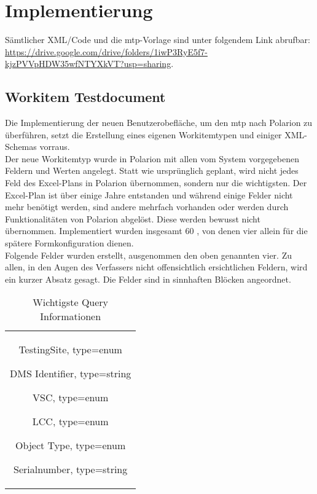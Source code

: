 \chapter{Implementierung}
\label{cha:impl}
\thispagestyle{scrheadings}
Sämtliche\*r XML/Code und die \ac{mtp}-Vorlage sind unter folgendem Link abrufbar: \url{https://drive.google.com/drive/folders/1iwP3RyE5f7-kjzPVVpHDW35wfNTYXkVT?usp=sharing}.
\section{Workitem Testdocument}
\label{sec:testdocu}
Die Implementierung der neuen Benutzerobefläche, um den \ac{mtp} nach Polarion zu überführen, setzt die Erstellung eines eigenen Workitemtypen und einiger XML-Schemas vorraus. \\
Der neue Workitemtyp  wurde in Polarion mit allen vom System vorgegebenen Feldern und Werten angelegt.
Statt wie ursprünglich geplant, wird nicht jedes Feld des Excel-Plans in Polarion übernommen, sondern nur die wichtigsten. Der Excel-Plan ist über einige Jahre entstanden und während einige Felder nicht mehr benötigt werden, sind andere mehrfach vorhanden oder werden durch Funktionalitäten von Polarion abgelöst. Diese werden bewusst nicht übernommen. Implementiert wurden insgesamt 60 , von denen vier allein für die spätere Formkonfiguration dienen.\\
Folgende Felder wurden erstellt, ausgenommen den oben genannten vier.
Zu allen, in den Augen des Verfassers nicht offensichtlich ersichtlichen Feldern, wird ein kurzer Absatz gesagt. Die Felder sind in sinnhaften Blöcken angeordnet.
\newpage
%
\begin{table}[H]
  \centering
  \begin{tabular}{c}
  \parbox{10cm}{
    \begin{compactitem}
  \item TestingSite, type=enum
	\item DMS Identifier, type=string
	\item VSC, type=enum
    \item LCC, type=enum
	\item Object Type, type=enum
	\item Serialnumber, type=string
\end{compactitem}}
  \end{tabular}\\
  \label{tab:first}
  \caption{Wichtigste Query Informationen}
\end{table}

